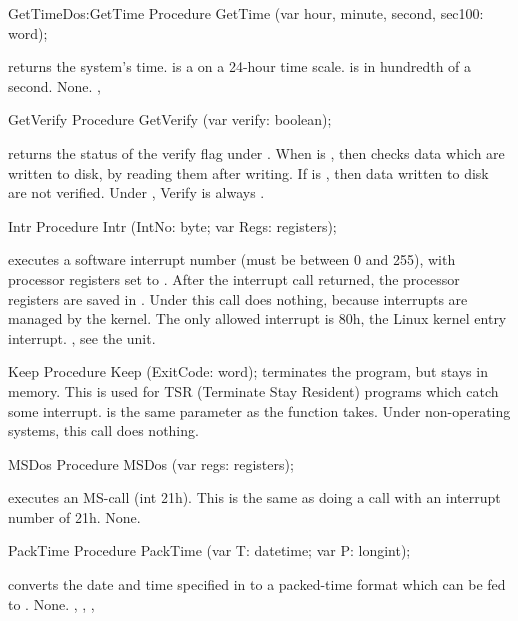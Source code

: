 \begin{procedurel}{GetTime}{Dos:GetTime}
\Declaration
Procedure GetTime (var hour, minute, second, sec100: word);
\Description

 returns the system's time.  is a on a 24-hour time
scale.  is in hundredth of a
second.
\Errors
None.
\SeeAlso
{},
\end{procedurel}




\begin{procedure}{GetVerify}
\Declaration
Procedure GetVerify (var verify: boolean);
\Description

 returns the status of the verify flag under \dos. When
 is , then \dos checks data which are written to disk,
by reading them after writing. If  is , then data
written to disk are not verified.
\Errors
Under \linux,  Verify is always
.
\SeeAlso
{}
\end{procedure}
\begin{procedure}{Intr}
\Declaration
Procedure Intr (IntNo: byte; var Regs: registers);
\Description

 executes a software interrupt number  (must be between
0 and 255), with processor registers set to . After the interrupt call
returned, the processor registers are saved in .
\Errors
Under \linux this call does nothing, because interrupts are managed by the
kernel. The only allowed interrupt is 80h, the Linux kernel entry interrupt.
\SeeAlso
{}, see the \linux unit.
\end{procedure}

\begin{procedure}{Keep}
\Declaration
Procedure Keep (ExitCode: word);
\Description
{} terminates the program, but stays in memory. This is used for TSR
(Terminate Stay Resident) programs which catch some interrupt.
 is the same parameter as the  function takes.
\Errors
Under non-\dos operating systems, this call does nothing.
\SeeAlso
{}
\end{procedure}
\begin{procedure}{MSDos}
\Declaration
Procedure MSDos (var regs: registers);
\Description

 executes an MS-\dos call (int 21h). This is the same as doing a
 call with an interrupt number of 21h.
\Errors
None.
\SeeAlso
{}
\end{procedure}
\begin{procedure}{PackTime}
\Declaration
Procedure PackTime (var T: datetime; var P: longint);
\Description

 converts the date and time specified in 
to a packed-time format which can be fed to .
\Errors
None.
\SeeAlso
{}, , , 
\end{procedure}


